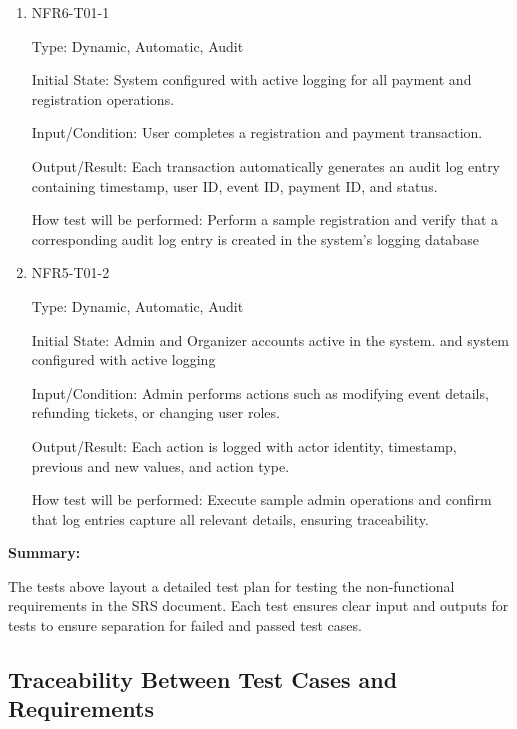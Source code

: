 \documentclass[12pt, titlepage]{article}
\begin{document}
\begin{enumerate}
\item{NFR6-T01-1\\}

Type: Dynamic, Automatic, Audit

Initial State: System configured with active logging for all payment and registration operations.

Input/Condition: User completes a registration and payment transaction.

Output/Result: Each transaction automatically generates an audit log entry containing timestamp, user ID, event ID, payment ID, and status.

How test will be performed: Perform a sample registration and verify that a corresponding audit log entry is created in the system’s logging database

\item{NFR5-T01-2\\}

Type: Dynamic, Automatic, Audit

Initial State: Admin and Organizer accounts active in the system. and system configured with active logging

Input/Condition: Admin performs actions such as modifying event details, refunding tickets, or changing user roles.

Output/Result: Each action is logged with actor identity, timestamp, previous and new values, and action type.

How test will be performed: Execute sample admin operations and confirm that log entries capture all relevant details, ensuring traceability.
\end{enumerate}

\noindent\textbf{Summary:}

The tests above layout a detailed test plan for testing the non-functional requirements in the SRS document. Each test ensures clear input and outputs for tests to ensure separation for failed and passed test cases.

\subsection{Traceability Between Test Cases and Requirements}
\end{document}
